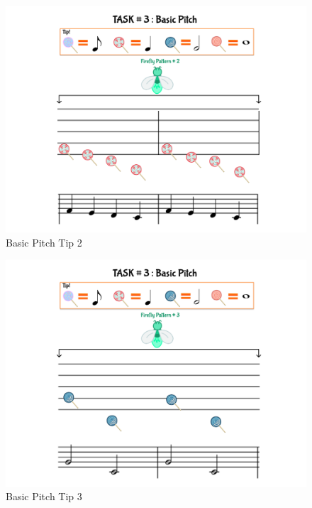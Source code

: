 \begin{figure}[H]
    \centering
    \includegraphics[width=12cm]{figures/NewFigures/BasicPitchTip2.png}
    \caption{Basic Pitch Tip 2}
    \label{fig:BasicPitchTip2}
\end{figure}

\begin{figure}[H]
    \centering
    \includegraphics[width=12cm]{figures/NewFigures/BasicPitchTip3.png}
    \caption{Basic Pitch Tip 3}
    \label{fig:BasicPitchTip3}
\end{figure}

